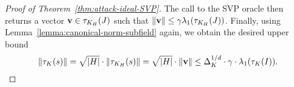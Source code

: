 \begin{proof}[Proof of Theorem~\ref{thm:attack-ideal-SVP}]
The call to the SVP oracle then returns a vector $\mathbf v \in \tau_{K_H}(J)$ such that $\|\mathbf v\| \leq \gamma \lambda_1(\tau_{K_H}(J))$. Finally, using Lemma~\ref{lemma:canonical-norm-subfield} again, we obtain the desired upper bound
\[ \|\tau_K(s)\| = \sqrt{|H|} \cdot \|\tau_{K_H}(s)\| = \sqrt{|H|} \cdot \|\mathbf v\| \leq \Delta_K^{1/d} \cdot \gamma \cdot \lambda_1(\tau_K(I)).\]
\end{proof}





